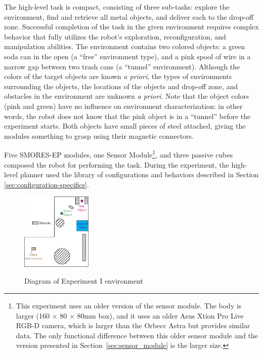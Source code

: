 \documentclass[journal]{IEEEtran}
\begin{document}
The high-level task is compact, consisting of three sub-tasks: explore the environment, find and retrieve all metal objects, and deliver each to the drop-off zone.  Successful completion of the task in the given environment requires complex behavior that fully utilizes the robot's exploration, reconfiguration, and manipulation abilities. The environment contains two colored objects: a green soda can in the open (a ``free'' environment type), and a pink spool of wire in a narrow gap between two trash cans (a ``tunnel'' environment). Although the colors of the target objects are known \textit{a priori}, the types of environments surrounding the objects, the locations of the objects and drop-off zone, and obstacles in the environment are unknown \textit{a priori}.  Note that the object colors (pink and green) have no influence on environment characterization: in other words, the robot does not know that the pink object is in a ``tunnel''  before the experiment starts.  Both objects have small pieces of steel attached, giving the modules something to grasp using their magnetic connectors.

Five SMORES-EP modules, one Sensor Module\footnote{This experiment uses an older version of the sensor module.  The body is larger (160 $\times$ 80 $\times$ 80mm box), and it uses an older Asus Xtion Pro Live RGB-D camera, which is larger than the Orbecc Astra but provides similar data.  The only functional difference between this older sensor module and the version presented in Section~\ref{sec:sensor_module} is the larger size.}, and three passive cubes composed the robot for performing the task. 
During the experiment, the high-level planner used the library of configurations and behaviors described in Section \ref{sec:configuration-specifics}.

\begin{figure}
\begin{center}
\includegraphics[width=0.3\textwidth]{images/RSSMap.png}
\caption{Diagram of Experiment I environment}
\vspace{-2em}
\label{fig:map}
\end{center}
\end{figure}
\end{document}

